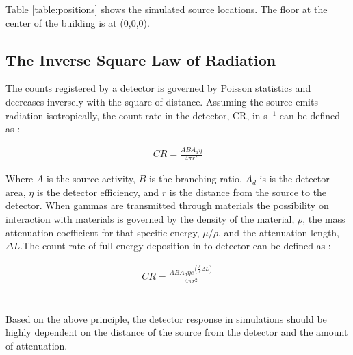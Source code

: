 Table \ref{table:positions} shows the simulated source locations. The floor at the center of the building is at (0,0,0).

\subsection{The Inverse Square Law of Radiation}
\label{subsec:inverse}
\noindent The counts registered by a detector is governed by Poisson statistics and decreases inversely with the square of distance. Assuming the source emits radiation isotropically, the count rate in the detector, CR, in s$^{-1}$ can be defined as \cite{morse}:

\begin{align}
CR = \frac{A B A_{d} \eta} {4\pi r^2} \label{eq1}
\end{align}

Where $A$ is the source activity, $B$ is the branching ratio, $A_{d}$ is is the detector area, $\eta$ is the detector efficiency, and $r$ is the distance from the source to the detector. When gammas are transmitted through materials the possibility on interaction with materials is governed by the density of the material, $\rho$, the mass attenuation coefficient for that specific energy, $\mu$/$\rho$, and the attenuation length, $\Delta$$L$.The count rate of full energy deposition in to detector can be defined as \cite{morse}:

\begin{align}
CR = \frac{A B A_{d} \eta e^(\frac{\mu}{\rho}\Delta L)} {4\pi r^2} \label{eq2}
\end{align}
\\\\
Based on the above principle, the detector response in simulations should be highly dependent on the distance of the source from the detector and the amount of attenuation.
